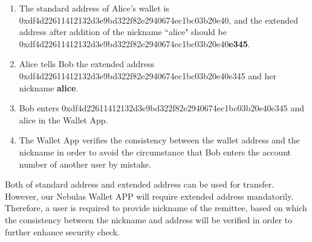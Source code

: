 \begin{enumerate}
	\item  The standard address of Alice’s wallet is  0xdf4d22611412132d3e9bd322f82e2940674ec1bc03b20e40, and the extended address after addition of the nickname ``alice" should be \\ 0xdf4d22611412132d3e9bd322f82e2940674ec1bc03b20e40\textbf{e345}.
	\item Alice tells Bob the extended address 0xdf4d22611412132d3e9bd322f82e2940674ec1bc03b20e40e345 and her nickname \textbf{alice}.
	\item Bob enters 0xdf4d22611412132d3e9bd322f82e2940674ec1bc03b20e40e345 and alice in the Wallet App.
	\item The Wallet App verifies the consistency between the wallet address and the nickname in order to avoid the circumstance that Bob enters the account number of another user by mistake.
\end{enumerate}

Both of standard address and extended address can be used for transfer. However, our Nebulas Wallet APP will require extended address mandatorily. Therefore, a user is required to provide nickname of the remittee, based on which the consistency between the nickname and address will be verified in order to further enhance security check.


